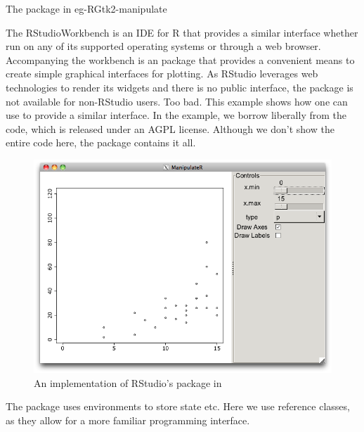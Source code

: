 \begin{example}{The  package in }{eg-RGtk2-manipulate}

The RStudio\texttrademark Workbench is an IDE for R that provides a
similar interface whether run on any of its supported operating
systems or through a web browser. Accompanying the workbench is an
\R{} package  that provides a convenient means to
create simple graphical interfaces for plotting. As RStudio leverages
web technologies to render its widgets and there is no public
interface, the package is not available for non-RStudio users. Too
bad. This example shows how one can use  to provide a
similar interface. In the example, we borrow liberally from the
 code, which is released under an AGPL
license. Although we don't show the entire code here, the
 package contains it all.

\begin{figure}
  \centering
  \includegraphics[width=.8\textwidth]{fig-RGtk2-manipulate.png}
  \caption{An implementation of RStudio's  package in }
  \label{fig:RGtk2-manipulate}
\end{figure}



The  package uses environments to store state
etc. Here we use reference classes, as they allow for a more
familiar programming interface. 


\end{example}
